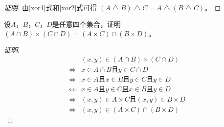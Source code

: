 \begin{proof}[证明]
  由\eqref{xor1}式和\eqref{xor2}式可得
  $(A\bigtriangleup B)\bigtriangleup C = A\bigtriangleup (B\bigtriangleup C)$。
\end{proof}

\begin{Ex}
设$A$，$B$，$C$，$D$是任意四个集合，证明$(A\cap B) \times (C \cap D) = (A
\times C)
\cap (B \times D)$。
\end{Ex}
\begin{proof}[证明]
  \begin{equation*}
    \begin{split}
    &(x,y) \in (A\cap B) \times (C \cap D)\\
    \Leftrightarrow&x \in A \cap B \text{且} y \in C \cap D\\
    \Leftrightarrow&x \in A \text{且} x \in B \text{且} y \in C \text{且} y \in D\\
    \Leftrightarrow&x \in A \text{且} y \in C \text{且} x \in B \text{且} y \in D\\
    \Leftrightarrow&(x,y) \in A \times C \text{且} (x,y) \in B \times D\\
    \Leftrightarrow&(x,y) \in (A\times C)\cap (B \times D)
    \end{split}
  \end{equation*}
\end{proof}

